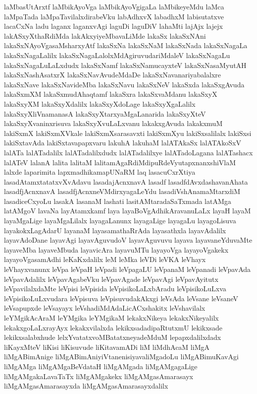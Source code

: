 {laMbasUtArxtf
laMbikAyoVga
laMbikAyoVgigaLa
laMbikeyeMdu
laMca
laMpaTada
laMpaTavilalxdirabeVku
labAdhxvX
labadhxM
labisutatxve
lacaCxNa
ladu
laganx
laganxvAgi
laguDi
laguDiV
lahaMti
lajAjx
lajejx
lakASxyXthaRdiMda
lakAkxyiyeMbavaLiMde
lakaSx
lakaSxNAni
lakaSxNAyoVgasaMsharxyAtf
lakaSxNa
lakaSxNaM
lakaSxNada
lakaSxNagaLa
lakaSxNagaLalilx
lakaSxNagaLalolxMdAgiruvudariMdaleV
lakaSxNagaLu
lakaSxNagaLuLaLxdudx
lakaSxNamf
lakaSxNamucayxteV
lakaSxNasaMyutAH
lakaSxNashAsatxrX
lakaSxNavAvudeMdaDe
lakaSxNavanariyabalalxre
lakaSxNave
lakaSxNavideMba
lakaSxNavu
lakaSxNeV
lakaSxda
lakaSxgAvuda
lakaSxmXM
lakaSxmudAhaqtamf
lakaSxra
lakaSxvaMdanu
lakaSxyX
lakaSxyXM
lakaSxyXdalilx
lakaSxyXdoLage
lakaSxyXgaLalilx
lakaSxyXliVnamanasA
lakaSxyXtarxyaMgaLanarida
lakaSxyXteV
lakaSxyXvaninxrisuva
lakaSxyXvuLaLxvanu
lakakxgAvuda
lakakxmuM
lakiSxmX
lakiSxmXVkale
lakiSxmXsarasavxti
lakiSxmXyu
lakiSxsalilalx
lakiSxsi
lakiSxtavAda
lakiSxtavapapxvaru
lakuhA
lakuhaM
lalATAkaSx
lalATAkoSxV
lalATa
lalATadalilx
lalATadalilxdudx
lalATadalilxye
lalATadoLagana
lalATashacx
lalATeV
lalanA
lalita
lalitaM
lalitamAgaRdiMdipuRdeVyutapxnanxshiVlaM
lalxde
laparimita
lapxmadhikamapUNaRM
laq
lasacuCxrXtiya
lasadAtamxtatatxvXvAdavu
lasadajAcnxnavA
lasadf
lasadfdAvxdashavanAhata
lasadfjAcnxnavA
lasadfjAcnxneVMdirxyagaLeYdu
lasadiVshAnamaMtarxdiM
lasadiceCxyoLu
lasakA
lasanaM
lashati
lasitAMtaradaSaTxmada
latAMga
latAMgoV
lavaNa
layAtamxkamf
laya
layaBoVgAdhikAravanuLaLx
layaH
layaM
layaMgaLige
layaMgaLilalx
layagaLanunx
layagaLige
layagaLu
layagoLisuva
layakokxLagAdarU
layanaM
layasamathaRrAda
layasathxla
layavAdalilx
layavAdoDane
layavAgi
layavAguvudoV
layavAguvuvu
layava
layavaneYduvaMte
layaveMba
layaveMbuda
layavicAra
layavuMTu
layayoVga
layayoVgakekx
layayoVgasamAdhi
leKaKxdalilx
leM
leMka
leVDi
leVKA
leVhayx
leVhayxvanunx
leVpa
leVpaH
leVpadi
leVpagaLU
leVpanaM
leVpanadi
leVpavAda
leVpavAdalilx
leVpavAgabeVku
leVpavAgade
leVpavAgi
leVpavAyitutx
leVpavilalxdaMte
leVpisi
leVpisida
leVpisikoLaLxbAradu
leVpisikoLuLxva
leVpisikoLuLxvudara
leVpisuva
leVpisuvudakAkxgi
leVsAda
leVsane
leVsaneV
leVsapupxde
leVsayayx
leVshadiMdAdaLicACxshakitx
leVshavilalx
leYMgikAcAraM
leYMgika
leYMgikaM
lekakxNikeya
lekakxNikeyalilx
lekakxgoLaLxrayAyx
lekakxvilalxda
lekikxsadadipaRtutxmU
lekikxsade
lekikxsalabxhude
lelxYvatatxvoMBatatxneyadeMduM
lepapxdalilxdadx
liKayxMteV
liKisi
liKisuvude
liKitavamADi
liM
liMdhAcaM
liMgA
liMgABimAnige
liMgABimAniyiVtanenisiyavaliMgadoLu
liMgABimuKavAgi
liMgAMga
liMgAMgaBeVdataH
liMgAMgada
liMgAMgagaLige
liMgAMgakaLavaTaTx
liMgAMgakekx
liMgAMgasAmarasayx
liMgAMgasAmarasayxda
liMgAMgasAmarasayxdalilx
}
